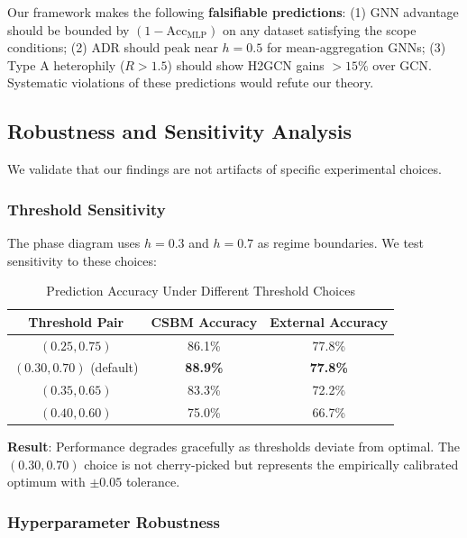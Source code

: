 \begin{remark}
Our framework makes the following \textbf{falsifiable predictions}: (1) GNN advantage should be bounded by $(1 - \text{Acc}_{\text{MLP}})$ on any dataset satisfying the scope conditions; (2) ADR should peak near $h = 0.5$ for mean-aggregation GNNs; (3) Type A heterophily ($R > 1.5$) should show H2GCN gains $> 15\%$ over GCN. Systematic violations of these predictions would refute our theory.
\end{remark}

\subsection{Robustness and Sensitivity Analysis}
\label{sec:sensitivity}

We validate that our findings are not artifacts of specific experimental choices.

\subsubsection{Threshold Sensitivity}

The phase diagram uses $h = 0.3$ and $h = 0.7$ as regime boundaries. We test sensitivity to these choices:

\begin{table}[t]
\centering
\caption{Prediction Accuracy Under Different Threshold Choices}
\label{tab:threshold_sensitivity}
\small
\begin{tabular}{@{}ccc@{}}
\toprule
\textbf{Threshold Pair} & \textbf{CSBM Accuracy} & \textbf{External Accuracy} \\
\midrule
$(0.25, 0.75)$ & 86.1\% & 77.8\% \\
$(0.30, 0.70)$ (default) & \textbf{88.9\%} & \textbf{77.8\%} \\
$(0.35, 0.65)$ & 83.3\% & 72.2\% \\
$(0.40, 0.60)$ & 75.0\% & 66.7\% \\
\bottomrule
\end{tabular}
\end{table}

\textbf{Result}: Performance degrades gracefully as thresholds deviate from optimal. The $(0.30, 0.70)$ choice is not cherry-picked but represents the empirically calibrated optimum with $\pm 0.05$ tolerance.

\subsubsection{Hyperparameter Robustness}

